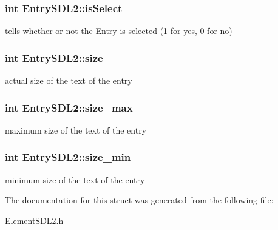 \subsubsection[{\texorpdfstring{is\+Select}{isSelect}}]{\setlength{\rightskip}{0pt plus 5cm}int Entry\+S\+D\+L2\+::is\+Select}\hypertarget{structEntrySDL2_a92de743f9f3ea22c88f132f05793ba0b}{}\label{structEntrySDL2_a92de743f9f3ea22c88f132f05793ba0b}
tells whether or not the Entry is selected (1 for yes, 0 for no) 
\subsubsection[{\texorpdfstring{size}{size}}]{\setlength{\rightskip}{0pt plus 5cm}int Entry\+S\+D\+L2\+::size}\hypertarget{structEntrySDL2_adad4bfa55d814798c0198b3dc1b17514}{}\label{structEntrySDL2_adad4bfa55d814798c0198b3dc1b17514}
actual size of the text of the entry 
\subsubsection[{\texorpdfstring{size\+\_\+max}{size_max}}]{\setlength{\rightskip}{0pt plus 5cm}int Entry\+S\+D\+L2\+::size\+\_\+max}\hypertarget{structEntrySDL2_a527d25625060a6f0770873b1c3039f73}{}\label{structEntrySDL2_a527d25625060a6f0770873b1c3039f73}
maximum size of the text of the entry 
\subsubsection[{\texorpdfstring{size\+\_\+min}{size_min}}]{\setlength{\rightskip}{0pt plus 5cm}int Entry\+S\+D\+L2\+::size\+\_\+min}\hypertarget{structEntrySDL2_a6713933ba31b9a8f3436dbc93f205340}{}\label{structEntrySDL2_a6713933ba31b9a8f3436dbc93f205340}
minimum size of the text of the entry 

The documentation for this struct was generated from the following file\+:\begin{DoxyCompactItemize}
\item 
\hyperlink{ElementSDL2_8h}{Element\+S\+D\+L2.\+h}\end{DoxyCompactItemize}
